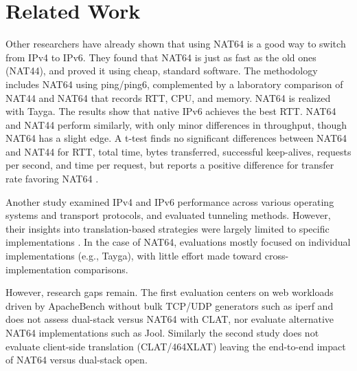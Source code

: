 \chapter{Related Work}

Other researchers have already shown that using NAT64 is a good way to switch from IPv4 to IPv6. They found that NAT64 is just as fast as the old ones (NAT44), and proved it using cheap, standard software\cite{llanto2012performance}. The methodology includes NAT64 using ping/ping6, complemented by a laboratory comparison of NAT44 and NAT64 that records RTT, CPU, and memory\cite{llanto2012performance}. NAT64 is realized with Tayga. The results show that native IPv6 achieves the best RTT. NAT64 and NAT44 perform similarly, with only minor differences in throughput, though NAT64 has a slight edge\cite{llanto2012performance}. A t-test finds no significant differences between NAT64 and NAT44 for RTT, total time, bytes transferred, successful keep-alives, requests per second, and time per request, but reports a positive difference for transfer rate favoring NAT64 \cite{llanto2012performance}.


Another study examined IPv4 and IPv6 performance across various operating systems and transport protocols, and evaluated tunneling methods. However, their insights into translation-based strategies were largely limited to specific implementations \cite{quintero2016performance}. In the case of NAT64, evaluations mostly focused on individual implementations (e.g., Tayga), with little effort made toward cross-implementation comparisons\cite{quintero2016performance}.


However, research gaps remain. The first evaluation\cite{llanto2012performance} centers on web workloads driven by ApacheBench without bulk TCP/UDP generators such as iperf and does not assess dual-stack versus NAT64 with CLAT, nor evaluate alternative NAT64 implementations such as Jool. Similarly the second study\cite{quintero2016performance} does not evaluate client-side translation (CLAT/464XLAT) leaving the end-to-end impact of NAT64 versus dual-stack open\cite{llanto2012performance,quintero2016performance}.
